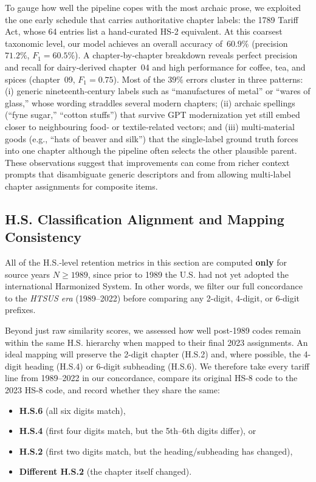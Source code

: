 \documentclass[12pt]{article}
\begin{document}
To gauge how well the pipeline copes with the most archaic prose, we exploited the one early schedule that carries authoritative chapter labels: the 1789 Tariff Act, whose 64 entries list a hand‑curated HS‑2 equivalent. At this coarsest taxonomic level, our model achieves an overall accuracy of~$60.9\%$ (precision~$71.2\%$, $F_{1} = 60.5\%$). A chapter‑by‑chapter breakdown reveals perfect precision and recall for dairy‑derived chapter~04 and high performance for coffee, tea, and spices (chapter~09, $F_{1} = 0.75$). Most of the $39\%$ errors cluster in three patterns: (i) generic nineteenth‑century labels such as ``manufactures of metal'' or ``wares of glass,'' whose wording straddles several modern chapters; (ii) archaic spellings (``fyne sugar,'' ``cotton stuffs'') that survive GPT modernization yet still embed closer to neighbouring food‑ or textile‑related vectors; and (iii) multi‑material goods (e.g., ``hats of beaver and silk'') that the single‑label ground truth forces into one chapter although the pipeline often selects the other plausible parent. These observations suggest that improvements can come from richer context prompts that disambiguate generic descriptors and from allowing multi‑label chapter assignments for composite items.



\subsection{H.S. Classification Alignment and Mapping Consistency}

All of the H.S.‐level retention metrics in this section are computed \textbf{only} for source years $N\ge1989$, since prior to 1989 the U.S. had not yet adopted the international Harmonized System.  In other words, we filter our full concordance to the \emph{HTSUS era} (1989–2022) before comparing any 2-digit, 4-digit, or 6-digit prefixes.

Beyond just raw similarity scores, we assessed how well post-1989 codes remain within the same H.S. hierarchy when mapped to their final 2023 assignments.  An ideal mapping will preserve the 2-digit chapter (H.S.2) and, where possible, the 4-digit heading (H.S.4) or 6-digit subheading (H.S.6).  We therefore take every tariff line from 1989–2022 in our concordance, compare its original HS-8 code to the 2023 HS-8 code, and record whether they share the same:

\begin{itemize}
  \item \textbf{H.S.6} (all six digits match),
  \item \textbf{H.S.4} (first four digits match, but the 5th–6th digits differ), or
  \item \textbf{H.S.2} (first two digits match, but the heading/subheading has changed),
  \item \textbf{Different H.S.2} (the chapter itself changed).
\end{itemize}
\end{document}
